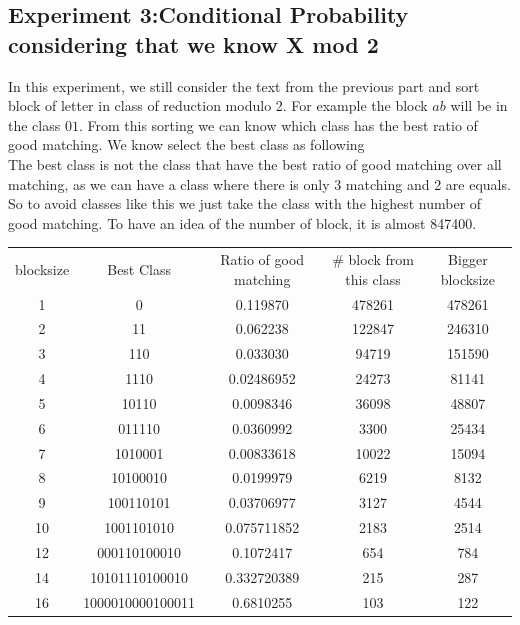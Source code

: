 \documentclass{article}
\begin{document}
\subsection*{Experiment 3:Conditional Probability considering that we know X mod 2}
In this experiment, we still consider the text from the previous part and sort block of letter in class of reduction modulo 2.
For example the block $ab$ will be in the class $01$. From this sorting we can know which class has the best ratio of good matching.
We know select the best class as following\\
The best class is not the class that have the best ratio of good matching over all matching, as we can have a class where there is only 3 matching and 2 are equals. So to avoid classes like this we just take the class with the highest number of good matching.
To have an idea of the number of block, it is almost 847400.\\
\begin{tabular}{c|c|c|c|c}
  \hline
  blocksize & Best Class & Ratio of good matching & \# block from this class & Bigger blocksize\\
	1 & 0 & 0.119870 & 478261 & 478261\\
	2 & 11 & 0.062238 & 122847 & 246310\\
	3 & 110 & 0.033030 & 94719 & 151590\\
	4 & 1110 & 0.02486952 & 24273 & 81141\\
	5 & 10110 & 0.0098346 & 36098 & 48807\\
	6 & 011110 & 0.0360992 & 3300 & 25434\\
	7 & 1010001 & 0.00833618 & 10022 & 15094\\
	8 & 10100010 & 0.0199979 & 6219 & 8132\\
	9 & 100110101 & 0.03706977 & 3127 & 4544\\
	10 & 1001101010 & 0.075711852 & 2183 & 2514\\
	12 & 000110100010 & 0.1072417 & 654 & 784\\
	14 & 10101110100010 & 0.332720389 & 215 & 287\\
	16 & 1000010000100011 & 0.6810255 & 103 & 122\\
	\hline
\end{tabular}

\appendix
\newpage
\end{document}
